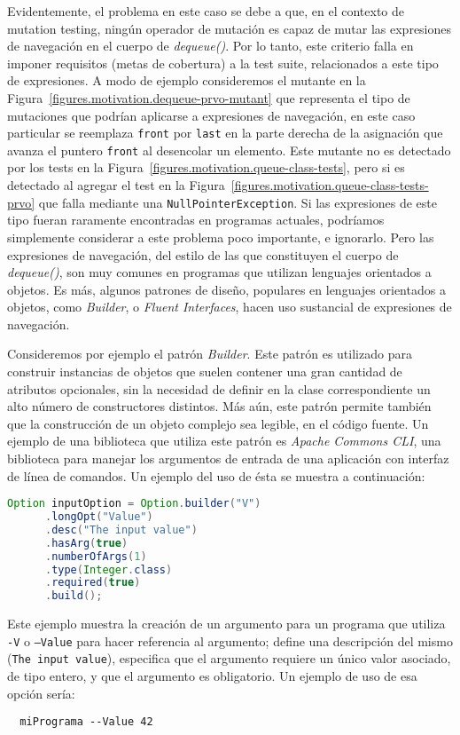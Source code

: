 Evidentemente, el problema en este caso se debe a que, en el contexto de mutation testing, ning\'un operador de mutaci\'on es capaz de mutar las expresiones de navegaci\'on en el cuerpo de \emph{dequeue()}. Por lo tanto, este criterio falla en imponer requisitos (metas de cobertura) a la test suite, relacionados a este tipo de expresiones. A modo de ejemplo consideremos el mutante en la Figura~\ref{figures.motivation.dequeue-prvo-mutant} que representa el tipo de mutaciones que podr\'ian aplicarse a expresiones de navegaci\'on, en este caso particular se reemplaza \lstinline{front} por \lstinline{last} en la parte derecha de la asignaci\'on que avanza el puntero \lstinline{front} al desencolar un elemento. Este mutante no es detectado por los tests en la Figura~\ref{figures.motivation.queue-class-tests}, pero si es detectado al agregar el test en la Figura~\ref{figures.motivation.queue-class-tests-prvo} que falla mediante una \lstinline{NullPointerException}. Si las expresiones de este tipo fueran raramente encontradas en programas actuales, podr\'iamos simplemente considerar a este problema poco importante, e ignorarlo. Pero las expresiones de navegaci\'on, del estilo de las que constituyen el cuerpo de \emph{dequeue()}, son muy comunes en programas que utilizan lenguajes orientados a objetos. Es m\'as, algunos patrones de dise\~no, populares en lenguajes orientados a objetos, como \emph{Builder}, o \emph{Fluent Interfaces}, hacen uso sustancial de expresiones de navegaci\'on.

Consideremos por ejemplo el patr\'on \emph{Builder}. Este patr\'on es utilizado para construir instancias de objetos que suelen contener una gran cantidad de atributos opcionales, sin la necesidad de definir en la clase correspondiente un alto n\'umero de constructores distintos. M\'as a\'un, este patr\'on permite tambi\'en que la construcci\'on de un objeto complejo sea legible, en el c\'odigo fuente. Un ejemplo de una biblioteca que utiliza este patr\'on es \emph{Apache Commons CLI}, una biblioteca para manejar los argumentos de entrada de una aplicaci\'on con interfaz de l\'inea de comandos. Un ejemplo del uso de \'esta se muestra a continuaci\'on:
\begin{center}
	\begin{lstlisting}[mathescape=true, language=Java,showstringspaces=false,basicstyle={}]
    Option inputOption = Option.builder("V")
      .longOpt("Value")
      .desc("The input value")
      .hasArg(true)
      .numberOfArgs(1)
      .type(Integer.class)
      .required(true)
      .build();
	\end{lstlisting}
\end{center}
Este ejemplo muestra la creaci\'on de un argumento para un programa que utiliza \texttt{-V} o \texttt{--Value} para hacer referencia al argumento; define una descripci\'on del mismo (\texttt{The input value}), especifica que el argumento requiere un \'unico valor asociado, de tipo entero, y que el argumento es obligatorio. Un ejemplo de uso de esa opci\'on ser\'ia:
\begin{lstlisting}
  miPrograma --Value 42
\end{lstlisting}

